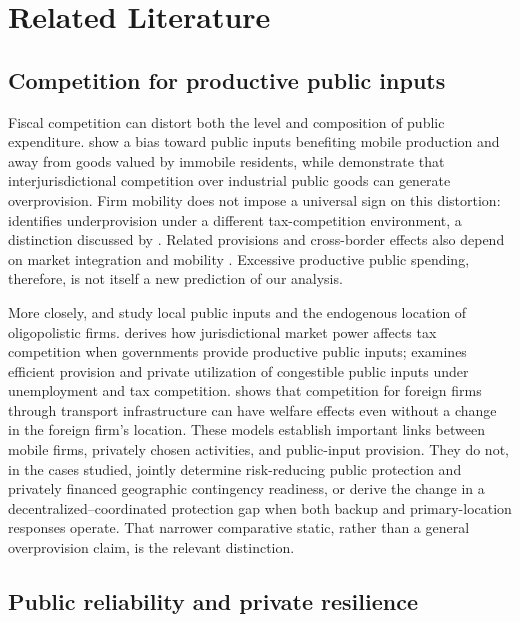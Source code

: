 \section{Related Literature}\label{sec:literature}

\subsection{Competition for productive public inputs}

Fiscal competition can distort both the level and composition of public expenditure. \citet{KeenMarchand1997} show a bias toward public inputs benefiting mobile production and away from goods valued by immobile residents, while \citet{BayindirUpmann1998} demonstrate that interjurisdictional competition over industrial public goods can generate overprovision. Firm mobility does not impose a universal sign on this distortion: \citet{Matsumoto1998} identifies underprovision under a different tax-competition environment, a distinction discussed by \citet{Ogawa2010}. Related provisions and cross-border effects also depend on market integration and mobility \citep{Ihara2008}. Excessive productive public spending, therefore, is not itself a new prediction of our analysis.

More closely, \citet{WalzWellisch1996} and \citet{MaurerWalz2000} study local public inputs and the endogenous location of oligopolistic firms. \citet{Billon2023} derives how jurisdictional market power affects tax competition when governments provide productive public inputs; \citet{Pauser2026} examines efficient provision and private utilization of congestible public inputs under unemployment and tax competition. \citet{MoritaOkoshi2025} shows that competition for foreign firms through transport infrastructure can have welfare effects even without a change in the foreign firm's location. These models establish important links between mobile firms, privately chosen activities, and public-input provision. They do not, in the cases studied, jointly determine risk-reducing public protection and privately financed geographic contingency readiness, or derive the change in a decentralized--coordinated protection gap when both backup and primary-location responses operate. That narrower comparative static, rather than a general overprovision claim, is the relevant distinction.

\subsection{Public reliability and private resilience}

